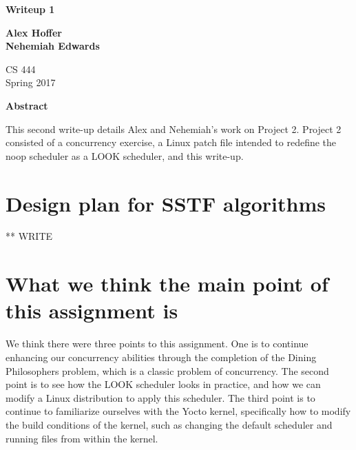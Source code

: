 \documentclass[letterpaper,10pt,titlepage]{article}
\begin{document}
\begin{titlepage}
    \begin{center}
        \vspace*{3.5cm}

        \textbf{Writeup 1}

        \vspace{0.5cm}

        \textbf{Alex Hoffer\\}
	\textbf{Nehemiah Edwards}

        \vspace{0.8cm}

        CS 444\\
        Spring 2017\\

        \vspace{1cm}

        \textbf{Abstract}\\

        \vspace{0.5cm}

	This second write-up details Alex and Nehemiah's work on Project 2. Project 2 consisted of a concurrency exercise, a Linux patch file intended to redefine the noop scheduler as a LOOK scheduler, and this write-up. 


        \vfill

    \end{center}
\end{titlepage}

\newpage

\tableofcontents

\newpage

\section{Design plan for SSTF algorithms}
** WRITE

\section{What we think the main point of this assignment is}
We think there were three points to this assignment. One is to continue enhancing our concurrency abilities through the completion of the Dining Philosophers problem, which is a classic problem of concurrency. The second point is to see how the LOOK scheduler looks in practice, and how we can modify a Linux distribution to apply this scheduler. The third point is to continue to familiarize ourselves with the Yocto kernel, specifically how to modify the build conditions of the kernel, such as changing the default scheduler and running files from within the kernel.
\end{document}
